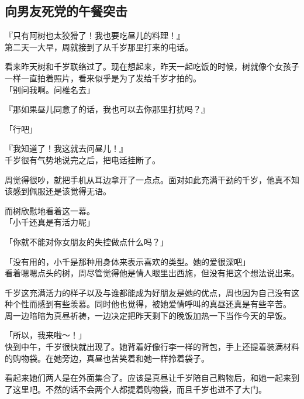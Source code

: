 \subsection{向男友死党的午餐突击}

『只有阿树也太狡猾了！我也要吃昼儿的料理！』\\

第二天一大早，周就接到了从千岁那里打来的电话。

看来昨天树和千岁联络过了。现在想起来，昨天一起吃饭的时候，树就像个女孩子一样一直拍着照片，看来似乎是为了发给千岁才拍的。\\

「别问我啊。问椎名去」

『那如果昼儿同意了的话，我也可以去你那里打扰吗？』

「行吧」

『我知道了！我这就去问昼儿！』\\

千岁很有气势地说完之后，把电话挂断了。

周觉得很吵，就把手机从耳边拿开了一点点。面对如此充满干劲的千岁，他真不知该感到佩服还是该觉得无语。

而树欣慰地看着这一幕。\\

「小千还真是有活力呢」

「你就不能对你女朋友的失控做点什么吗？」

「没有用的，小千是那种用身体来表示喜欢的类型。她的爱很深吧」\\

看着嗯嗯点头的树，周尽管觉得他是情人眼里出西施，但没有把这个想法说出来。

千岁这充满活力的样子以及与谁都能成为好朋友是她的优点，周也因为自己没有这种个性而感到有些羡慕。同时他也觉得，被她爱情呼叫的真昼还真是有些辛苦。\\

周一边暗暗为真昼祈祷，一边决定把昨天剩下的晚饭加热一下当作今天的早饭。\\

\vspace{2\baselineskip}

「所以，我来啦～！」\\

快到中午，千岁很快就出现了。她背着好像行李一样的背包，手上还提着装满材料的购物袋。在她旁边，真昼也苦笑着和她一样拎着袋子。

看起来她们两人是在外面集合了。应该是真昼让千岁陪自己购物后，和她一起来到了这里吧。不然的话不会两个人都提着购物袋，而且千岁也进不了大门。\\

